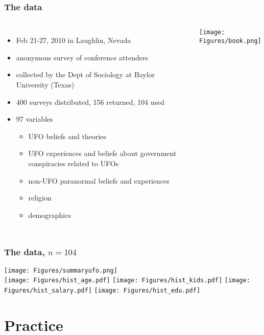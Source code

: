 \begin{frame}
\frametitle{The data}
\begin{columns}
\begin{itemize}
    \item
    Feb 21-27, 2010 in Laughlin, Nevada
    \item
    anonymous survey of conference attenders
    \item
    collected by the Dept of Sociology at Baylor University (Texas)
    \item
    400 surveys distributed, 156 returned, 104 used
    \item
    97 variables
    \begin{itemize}
        \item
        UFO beliefs and theories
        \item
        UFO experiences and beliefs about government conspiracies related to UFOs
        \item
        non-UFO paranormal beliefs and experiences
        \item
        religion
        \item
        demographics
    \end{itemize}
\end{itemize}
\texttt{[image: Figures/book.png]}
\end{columns}
\end{frame}


\begin{frame}
\frametitle{The data, $n=104$}
\texttt{[image: Figures/summaryufo.png]}\\
\vskip10pt
\texttt{[image: Figures/hist\_age.pdf]}
\texttt{[image: Figures/hist\_kids.pdf]}
\texttt{[image: Figures/hist\_salary.pdf]}
\texttt{[image: Figures/hist\_edu.pdf]}
\end{frame}

\section[Practice]{Practice}
\begin{frame}
\end{frame}

